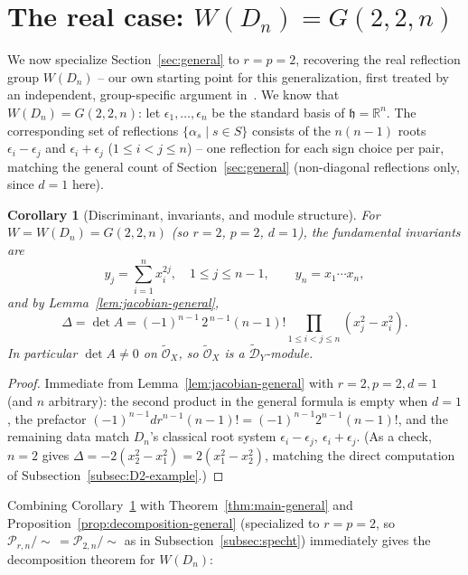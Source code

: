 \documentclass[11pt,a4paper]{article}
\newtheorem{corollary}[theorem]{Corollary}
\newcommand{\h}{\mathfrak{h}}
\begin{document}
\section{The real case: $W(D_n) = G(2,2,n)$}\label{sec:Dn}

We now specialize Section~\ref{sec:general} to $r=p=2$, recovering the
real reflection group $W(D_n)$ -- our own starting point for this
generalization, first treated by an independent, group-specific
argument in~\cite{NonkaneLawson2021}. We know that $W(D_n) = G(2,2,n)$: let
$\epsilon_1,\dots,\epsilon_n$ be the standard basis of
$\h = \mathbb{R}^n$. The corresponding set of reflections
$\{\alpha_s \mid s \in S\}$ consists of the $n(n-1)$ roots
$\epsilon_i - \epsilon_j$ and $\epsilon_i + \epsilon_j$
($1 \le i < j \le n$) -- one reflection for each sign choice per
pair, matching the general count of Section~\ref{sec:general}
(non-diagonal reflections only, since $d=1$ here).

\begin{corollary}[Discriminant, invariants, and module structure]\label{cor:Dn-setup}
For $W = W(D_n) = G(2,2,n)$ (so $r=2$, $p=2$, $d=1$), the fundamental
invariants are
\[
  y_j = \sum_{i=1}^n x_i^{2j}, \quad 1 \le j \le n-1, \qquad y_n = x_1\cdots x_n,
\]
and by Lemma~\ref{lem:jacobian-general},
\[
  \Delta = \det A = (-1)^{n-1}\, 2^{\,n-1}(n-1)! \prod_{1 \le i < j \le n} (x_j^2 - x_i^2).
\]
In particular $\det A \ne 0$ on $\widetilde{\mathcal{O}}_X$, so
$\widetilde{\mathcal{O}}_X$ is a $\widetilde{\mathcal{D}}_Y$-module.
\end{corollary}

\begin{proof}
Immediate from Lemma~\ref{lem:jacobian-general} with $r=2,p=2,d=1$
(and $n$ arbitrary): the second product in the general formula is
empty when $d=1$, the prefactor
$(-1)^{n-1}dr^{n-1}(n-1)!=(-1)^{n-1}2^{n-1}(n-1)!$, and the remaining
data match $D_n$'s classical root system
$\epsilon_i-\epsilon_j,\ \epsilon_i+\epsilon_j$. (As a check, $n=2$
gives $\Delta=-2(x_2^2-x_1^2)=2(x_1^2-x_2^2)$, matching the direct
computation of Subsection~\ref{subsec:D2-example}.)
\end{proof}

Combining Corollary~\ref{cor:Dn-setup} with Theorem~\ref{thm:main-general}
and Proposition~\ref{prop:decomposition-general} (specialized to
$r=p=2$, so $\mathcal{P}_{r,n}/\!\sim\, = \mathcal{P}_{2,n}/\!\sim$ as
in Subsection~\ref{subsec:specht}) immediately gives the decomposition theorem for
$W(D_n)$:
\end{document}

